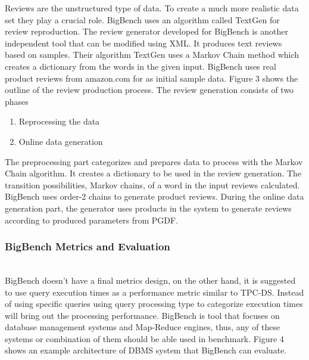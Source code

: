 \documentclass[sigconf,10pt]{acmart}
\begin{document}
Reviews are the unstructured type of data. To create a much more realistic data set they play a crucial role.
\newline
BigBench uses an algorithm called TextGen for review reproduction. The review generator developed for BigBench is another independent tool that can be modified using XML. It produces text reviews based on samples.
Their algorithm TextGen uses a Markov Chain method which creates a dictionary from the words in the given input. BigBench uses real product reviews from amazon.com for as initial sample data. Figure 3 shows the outline of the review production process.
\newline 
The review generation consists of two phases
\begin{enumerate}
   \item Reprocessing the data
   \item Online data generation
\end{enumerate}
The preprocessing part categorizes and prepares data to process with the Markov Chain algorithm. It creates a dictionary to be used in the review generation. The transition possibilities, Markov chains, of a word in the input reviews calculated. BigBench uses order-2 chains to generate product reviews.
\newline      
During the online data generation part, the generator uses products in the system to generate reviews according to produced parameters from PGDF.

\subsubsection{BigBench Metrics and Evaluation} \hfill\\
\newline 
BigBench doesn't have a final metrics design, on the other hand, it is suggested to use query execution times as a performance metric similar to TPC-DS. Instead of using specific queries using query processing type to categorize execution times will bring out the processing performance. \newline
BigBench is tool that focuses on database management systems and Map-Reduce engines, thus, any of these systems or combination of them should be able used in benchmark. Figure 4 shows an example architecture of DBMS system that BigBench can evaluate.
\end{document}
